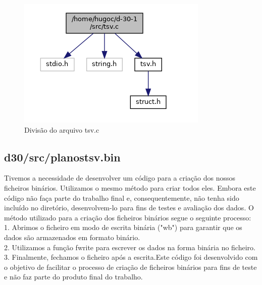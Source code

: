 \documentclass[a4wide]{report}
\begin{document}
\begin{figure}[h]
    \centering
    \includegraphics[width=0.5\linewidth]{tsc.c.png}
    \caption{Divisão do arquivo tsv.c}
    \label{fig:divisao-tsv}
 
\end{figure}
\subsection{d30/src/planostsv.bin}
Tivemos a necessidade de desenvolver um código para a criação dos nossos ficheiros binários.
Utilizamos o mesmo método para criar todos eles.
Embora este código não faça parte do trabalho final e, consequentemente, não tenha sido incluído no diretório, desenvolvem-lo para fins de testes e avaliação dos dados.
O método utilizado para a criação dos ficheiros binários segue o seguinte processo:
\\
1. Abrimos o ficheiro em modo de escrita binária ("wb") para garantir que os dados são armazenados em formato binário.
\\
2. Utilizamos a função fwrite para escrever os dados na forma binária no ficheiro.
\\
3. Finalmente, fechamos o ficheiro após a escrita.Este código foi desenvolvido com o objetivo de facilitar o processo de criação de ficheiros binários para fins de teste e não faz parte do produto final do trabalho.
\\
\end{document}
